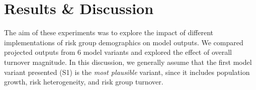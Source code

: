 \documentclass[10pt]{article}
\numberwithin{equation}{section}
\begin{document}
\section{Results \& Discussion}\label{s:results+discussion}
The aim of these experiments was to explore the impact of
different implementations of risk group demographics on model outputs.
We compared projected outputs from 6 model variants
and explored the effect of overall turnover magnitude.
In this discussion, we generally assume that
the first model variant presented (S1) is the \textit{most plausible} variant,
since it includes population growth, risk heterogeneity, and risk group turnover.
\end{document}
